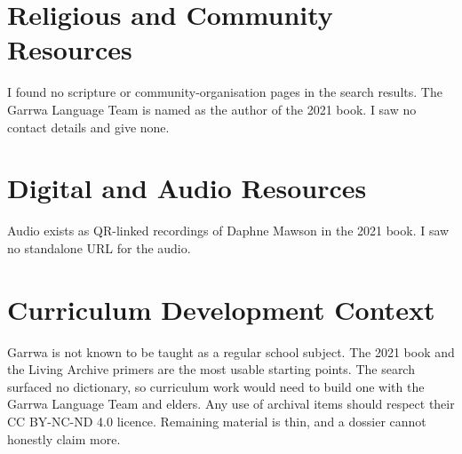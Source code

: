 \documentclass[12pt]{article}
\begin{document}
\section{Religious and Community Resources}
I found no scripture or community-organisation pages in the search results. The Garrwa Language Team is named as the author of the 2021 book. I saw no contact details and give none.

\section{Digital and Audio Resources}
Audio exists as QR-linked recordings of Daphne Mawson in the 2021 book. I saw no standalone URL for the audio.

\section{Curriculum Development Context}
Garrwa is not known to be taught as a regular school subject. The 2021 book and the Living Archive primers are the most usable starting points. The search surfaced no dictionary, so curriculum work would need to build one with the Garrwa Language Team and elders. Any use of archival items should respect their CC BY-NC-ND 4.0 licence. Remaining material is thin, and a dossier cannot honestly claim more.
\end{document}
